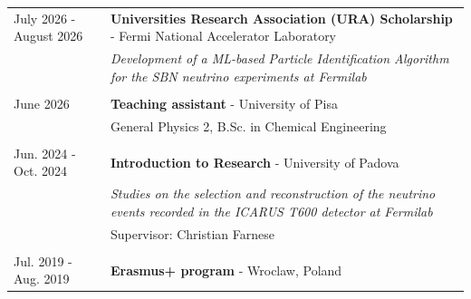 \documentclass[a4paper,12pt]{article}
\begin{document}
\begin{tabularx}{\linewidth}{@{}l X@{}}	

July 2026 - August 2026 & \textbf{Universities Research Association (URA) Scholarship} - Fermi National Accelerator Laboratory \\
& \textit{Development of a ML-based Particle Identification Algorithm for the SBN neutrino experiments at Fermilab} \\\\


June 2026 & \textbf{Teaching assistant} - University of Pisa \\ 
& General Physics 2, B.Sc. in Chemical Engineering \\\\


Jun. 2024 - Oct. 2024 & \textbf{Introduction to Research} - University of Padova \\
& \textit{Studies on the selection and reconstruction of the neutrino events recorded in the ICARUS T600 detector at Fermilab}\\ %
&Supervisor: Christian Farnese \\\\



Jul. 2019 - Aug. 2019 & \textbf{Erasmus+ program} - Wroclaw, Poland
\end{tabularx}
\end{document}
